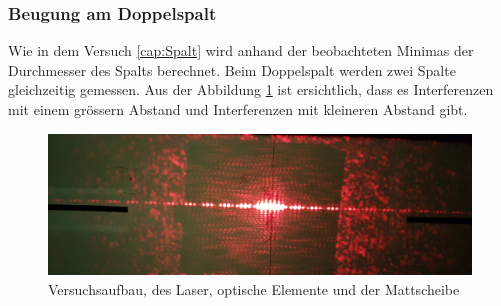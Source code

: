 \subsubsection{Beugung am Doppelspalt}
Wie in dem Versuch \ref{cap:Spalt} wird anhand der beobachteten Minimas der Durchmesser des Spalts berechnet. Beim Doppelspalt werden zwei Spalte gleichzeitig gemessen. Aus der Abbildung \ref{fig:doppelspalt} ist ersichtlich, dass es Interferenzen mit einem grössern Abstand und Interferenzen mit kleineren Abstand gibt.

\begin{figure}[h!]
	\centering
	\includegraphics[width=\textwidth]{data/versuch_doppelspalt}
	\caption{Versuchsaufbau, des Laser, optische Elemente und der Mattscheibe}
	\label{fig:doppelspalt}
\end{figure}
